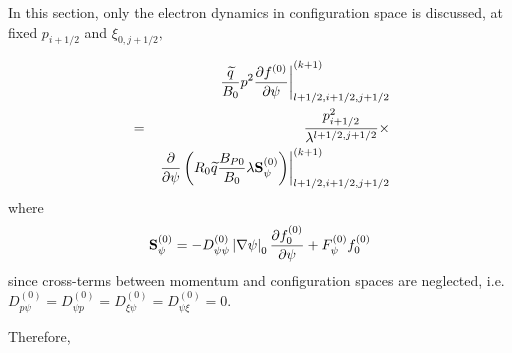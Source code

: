 
\label{fpdiscretespatial}In this section, only the electron dynamics
in configuration space is discussed, at fixed $p_{i+1/2}$ and $\xi
_{0,j+1/2},$

\begin{eqnarray}
&&\left. \frac{\widetilde{q}}{B_{0}}p^{2}\frac{\partial f^{\left( 0\right) }%
}{\partial \psi }\right| _{l+1/2,i+1/2,j+1/2}^{(k+1)}  \nonumber \\
&=&\frac{p_{i+1/2}^{2}}{\lambda ^{l+1/2,j+1/2}}\times   \nonumber \\
&&\left. \frac{\partial }{\partial \psi }\left( R_{0}\widetilde{q}\frac{%
B_{P0}}{B_{0}}\lambda \mathbf{S}_{\psi }^{\left( 0\right) }\right) \right|
_{l+1/2,i+1/2,j+1/2}^{(k+1)}
\end{eqnarray}
where
\begin{equation}
\mathbf{S}_{\psi }^{\left( 0\right) }=-D_{\psi \psi }^{\left( 0\right)
}\left| \nabla \psi \right| _{0}\frac{\partial f_{0}^{\left( 0\right) }}{%
\partial \psi }+F_{\psi }^{\left( 0\right) }f_{0}^{\left( 0\right) }
\end{equation}
since cross-terms between momentum and configuration spaces are neglected,
i.e. $D_{p\psi }^{\left( 0\right) }=D_{\psi p}^{\left( 0\right) }=D_{\xi
\psi }^{\left( 0\right) }=D_{\psi \xi }^{\left( 0\right) }=0.$

Therefore,

